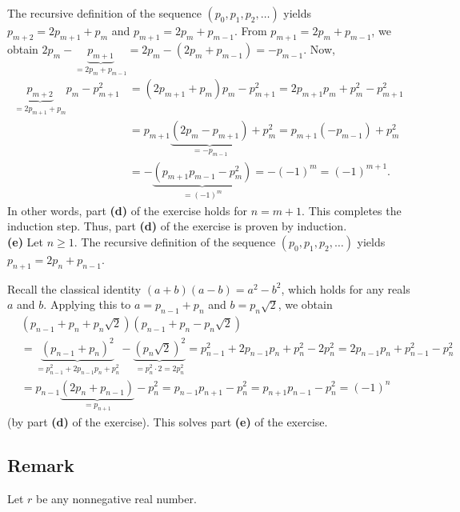 \documentclass[paper=a4, fontsize=12pt]{scrartcl}%
\theoremstyle{plainsl}
\theoremstyle{definition}
\theoremstyle{remark}
\begin{document}
The recursive definition of the sequence $\left(  p_{0},p_{1},p_{2}%
,\ldots\right)  $ yields $p_{m+2}=2p_{m+1}+p_{m}$ and $p_{m+1}=2p_{m}+p_{m-1}%
$. From $p_{m+1}=2p_{m}+p_{m-1}$, we obtain $2p_{m}-\underbrace{p_{m+1}%
}_{=2p_{m}+p_{m-1}}=2p_{m}-\left(  2p_{m}+p_{m-1}\right)  =-p_{m-1}$. Now,%
\begin{align*}
\underbrace{p_{m+2}}_{=2p_{m+1}+p_{m}}p_{m}-p_{m+1}^{2}  &  =\left(
2p_{m+1}+p_{m}\right)  p_{m}-p_{m+1}^{2}=2p_{m+1}p_{m}+p_{m}^{2}-p_{m+1}^{2}\\
&  =p_{m+1}\underbrace{\left(  2p_{m}-p_{m+1}\right)  }_{=-p_{m-1}}+p_{m}%
^{2}=p_{m+1}\left(  -p_{m-1}\right)  +p_{m}^{2}\\
&  =-\underbrace{\left(  p_{m+1}p_{m-1}-p_{m}^{2}\right)  }_{=\left(
-1\right)  ^{m}}=-\left(  -1\right)  ^{m}=\left(  -1\right)  ^{m+1}.
\end{align*}
In other words, part \textbf{(d)} of the exercise holds for $n=m+1$. This
completes the induction step. Thus, part \textbf{(d)} of the exercise is
proven by induction.\\[0.4cm]

\textbf{(e)} Let $n\geq1$. The recursive definition of the sequence $\left(
p_{0},p_{1},p_{2},\ldots\right)  $ yields $p_{n+1}=2p_{n}+p_{n-1}$.

Recall the classical identity $\left(  a+b\right)  \left(  a-b\right)
=a^{2}-b^{2}$, which holds for any reals $a$ and $b$. Applying this to
$a=p_{n-1}+p_{n}$ and $b=p_{n}\sqrt{2}$, we obtain%
\begin{align*}
&  \left(  p_{n-1}+p_{n}+p_{n}\sqrt{2}\right)  \left(  p_{n-1}+p_{n}%
-p_{n}\sqrt{2}\right) \\
&  =\underbrace{\left(  p_{n-1}+p_{n}\right)  ^{2}}_{=p_{n-1}^{2}%
+2p_{n-1}p_{n}+p_{n}^{2}}-\underbrace{\left(  p_{n}\sqrt{2}\right)  ^{2}%
}_{=p_{n}^{2}\cdot2=2p_{n}^{2}}=p_{n-1}^{2}+2p_{n-1}p_{n}+p_{n}^{2}-2p_{n}%
^{2}=2p_{n-1}p_{n}+p_{n-1}^{2}-p_{n}^{2}\\
&  =p_{n-1}\underbrace{\left(  2p_{n}+p_{n-1}\right)  }_{=p_{n+1}}-p_{n}%
^{2}=p_{n-1}p_{n+1}-p_{n}^{2}=p_{n+1}p_{n-1}-p_{n}^{2}=\left(  -1\right)  ^{n}%
\end{align*}
(by part \textbf{(d)} of the exercise). This solves part \textbf{(e)} of the exercise.

\subsection{Remark}

Let $r$ be any nonnegative real number.
\end{document}
